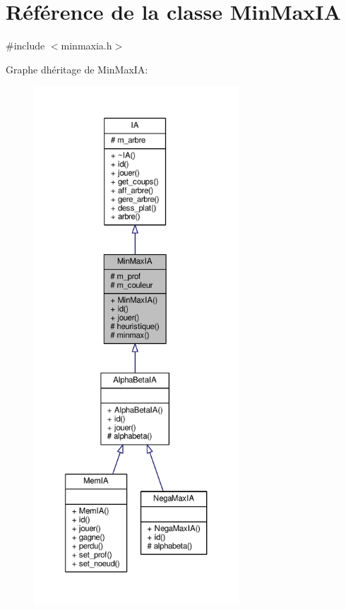 \hypertarget{classMinMaxIA}{}\section{Référence de la classe Min\+Max\+IA}
\label{classMinMaxIA}


{\ttfamily \#include $<$minmaxia.\+h$>$}



Graphe d\textquotesingle{}héritage de Min\+Max\+IA\+:\nopagebreak
\begin{figure}[H]
\begin{center}
\leavevmode
\includegraphics[height=550pt]{classMinMaxIA__inherit__graph}
\end{center}
\end{figure}


